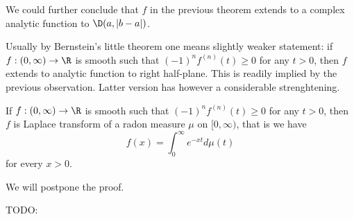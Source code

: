 We could further conclude that $f$ in the previous theorem extends to a complex analytic function to $\D(a, |b - a|)$.

Usually by Bernstein's little theorem one means slightly weaker statement: if $f : (0, \infty) \to \R$ is smooth such that $(-1)^{n} f^{(n)}(t) \geq 0$ for any $t > 0$, then $f$ extends to analytic function to right half-plane. This is readily implied by the previous observation. Latter version has however a considerable strenghtening.

\begin{lause}
	If $f : (0, \infty) \to \R$ is smooth such that $(-1)^{n} f^{(n)}(t) \geq 0$ for any $t > 0$, then $f$ is Laplace transform of a radon measure $\mu$ on $[0, \infty)$, that is we have
	\[
		f(x) = \int_{0}^{\infty} e^{-x t} d \mu(t)
	\]
	for every $x > 0$.
\end{lause}

We will postpone the proof.

TODO:

